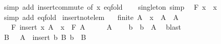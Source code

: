 \begin{isabellebody}
\ {\isacharparenleft}{\kern0pt}simp\ add{\isacharcolon}{\kern0pt}\ insert{\isacharunderscore}{\kern0pt}commute\ {\isacharbrackleft}{\kern0pt}of\ x{\isacharbrackright}{\kern0pt}\ eq{\isacharunderscore}{\kern0pt}fold{\isacharprime}{\kern0pt}{\isacharparenright}{\kern0pt}\isanewline
\ \ \isamarkupfalse%
\isanewline
{}\isamarkupfalse%
%
\endisatagproof
{\isafoldproof}%
%
\isadelimproof
\isanewline
%
\endisadelimproof
\isanewline
{}\isamarkupfalse%
\ singleton\ {\isacharbrackleft}{\kern0pt}simp{\isacharbrackright}{\kern0pt}{\isacharcolon}{\kern0pt}\isanewline
\ \ {\isachardoublequoteopen}F\ {\isacharbraceleft}{\kern0pt}x{\isacharbraceright}{\kern0pt}\ {\isacharequal}{\kern0pt}\ x{\isachardoublequoteclose}\isanewline
%
\isadelimproof
\ \ %
\endisadelimproof
%
\isatagproof
{}\isamarkupfalse%
\ {\isacharparenleft}{\kern0pt}simp\ add{\isacharcolon}{\kern0pt}\ eq{\isacharunderscore}{\kern0pt}fold{\isacharparenright}{\kern0pt}%
\endisatagproof
{\isafoldproof}%
%
\isadelimproof
\isanewline
%
\endisadelimproof
\isanewline
{}\isamarkupfalse%
\ insert{\isacharunderscore}{\kern0pt}not{\isacharunderscore}{\kern0pt}elem{\isacharcolon}{\kern0pt}\isanewline
\ \ \ {\isachardoublequoteopen}finite\ A{\isachardoublequoteclose}\ \ {\isachardoublequoteopen}x\ {\isasymnotin}\ A{\isachardoublequoteclose}\ \ {\isachardoublequoteopen}A\ {\isasymnoteq}\ {\isacharbraceleft}{\kern0pt}{\isacharbraceright}{\kern0pt}{\isachardoublequoteclose}\isanewline
\ \ \ {\isachardoublequoteopen}F\ {\isacharparenleft}{\kern0pt}insert\ x\ A{\isacharparenright}{\kern0pt}\ {\isacharequal}{\kern0pt}\ x\ \isactrlbold {\isacharasterisk}{\kern0pt}\ F\ A{\isachardoublequoteclose}\isanewline
%
\isadelimproof
%
\endisadelimproof
%
\isatagproof
{}\isamarkupfalse%
\ {\isacharminus}{\kern0pt}\isanewline
\ \ \isamarkupfalse%
\ {\isacartoucheopen}A\ {\isasymnoteq}\ {\isacharbraceleft}{\kern0pt}{\isacharbraceright}{\kern0pt}{\isacartoucheclose}\ \isamarkupfalse%
\ b\ \ {\isachardoublequoteopen}b\ {\isasymin}\ A{\isachardoublequoteclose}\ \isamarkupfalse%
\ blast\isanewline
\ \ \isamarkupfalse%
\ \isamarkupfalse%
\ B\ \ {\isacharasterisk}{\kern0pt}{\isacharcolon}{\kern0pt}\ {\isachardoublequoteopen}A\ {\isacharequal}{\kern0pt}\ insert\ b\ B{\isachardoublequoteclose}\ {\isachardoublequoteopen}b\ {\isasymnotin}\ B{\isachardoublequoteclose}\ \isamarkupfalse%

\end{isabellebody}
